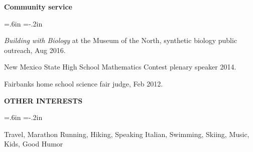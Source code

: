 \documentclass[10pt]{report}
\begin{document}
{
{\bf Community service}

\medskip

{ \leftskip=.6in \parindent=-.2in  \parskip=3pt

\emph{Building with Biology} at the Museum of the North, synthetic biology public outreach, Aug 2016.

New Mexico State High School Mathematics Contest plenary speaker 2014.

Fairbanks home school science fair judge, Feb 2012.

\mbox{}
}
}
{}


{\bf OTHER INTERESTS}

\medskip

{ \leftskip=.6in \parindent=-.2in  \parskip=3pt

Travel, Marathon Running, Hiking, Speaking Italian, Swimming, Skiing, Music, Kids,
Good Humor

}
\end{document}
